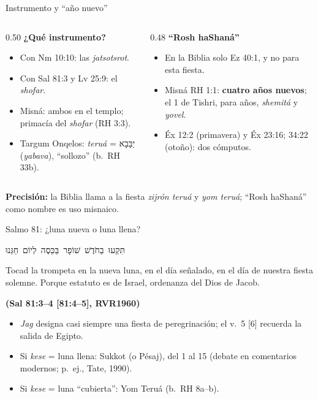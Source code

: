 \documentclass[hyperref={bookmarks=false},aspectratio=169]{beamer}
\newcommand{\heb}[1]{\mbox{\foreignlanguage{hebrew}{#1}}}
\newcommand{\fuente}[1]{\par\hfill{\upshape\bfseries\footnotesize\textcolor{tierraroja}{#1}}}
\newcommand{\destacar}[1]{\textbf{\textcolor{tierraroja}{#1}}}
\newcommand{\precision}[1]{{\footnotesize\color{sepia}\textbf{Precisión:} #1}}
\begin{document}
\begin{frame}{Instrumento y ``año nuevo''}
\begin{columns}[t,onlytextwidth]
\begin{column}{0.50\textwidth}\small\RaggedRight
\textbf{\textcolor{tierraroja}{¿Qué instrumento?}}
\begin{itemize}
\item Con Nm 10:10: las \emph{jatsotsrot}.
\item Con Sal 81:3 y Lv 25:9: el \emph{shofar}.
\item Misná: ambos en el templo; primacía del \emph{shofar} (RH 3:3).
\item Targum Onqelos: \emph{teruá} = \heb{יַבָּבָא} (\emph{yabava}), ``sollozo'' (b.~RH 33b).
\end{itemize}
\end{column}
\begin{column}{0.48\textwidth}\small\RaggedRight
\textbf{\textcolor{tierraroja}{``Rosh haShaná''}}
\begin{itemize}
\item En la Biblia solo Ez 40:1, y no para esta fiesta.
\item Misná RH 1:1: \destacar{cuatro años nuevos}; el 1 de Tishri, para años, \emph{shemitá} y \emph{yovel}.
\item Éx 12:2 (primavera) y Éx 23:16; 34:22 (otoño): dos cómputos.
\end{itemize}
\end{column}
\end{columns}\par\medskip
\precision{la Biblia llama a la fiesta \emph{zijrón teruá} y \emph{yom teruá}; ``Rosh haShaná'' como nombre es uso misnaico.}
\end{frame}

\begin{frame}{Salmo 81: ¿luna nueva o luna llena?}
\begin{center}\heb{תִּקְעוּ בַחֹדֶשׁ שׁוֹפָר בַּכֵּסֶה לְיוֹם חַגֵּנוּ}\end{center}
\begin{cita}Tocad la trompeta en la nueva luna, en el día señalado, en el día de nuestra fiesta solemne. Porque estatuto es de Israel, ordenanza del Dios de Jacob.\fuente{(Sal 81:3--4 [81:4--5], RVR1960)}\end{cita}
\small\RaggedRight
\begin{itemize}
\item \emph{Jag} designa casi siempre una fiesta de peregrinación; el v.~5 [6] recuerda la salida de Egipto.
\item Si \emph{kese} = luna llena: Sukkot (o Pésaj), del 1 al 15 (debate en comentarios modernos; p.~ej., Tate, 1990).
\item Si \emph{kese} = luna ``cubierta'': Yom Teruá (b.~RH 8a--b).
\end{itemize}
\end{frame}
\end{document}
